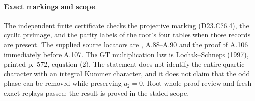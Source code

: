 \paragraph{Exact markings and scope.}
The independent finite certificate
checks the projective marking (D23.C36.4), the cyclic preimage,
and the parity labels of the root's four tables when those
records are present. The supplied source locators are
, A.88--A.90 and the proof
of A.106 immediately before A.107. The GT multiplication
law is Lochak--Schneps (1997), printed p.~572, equation (2).
The statement does not identify the entire quartic character
with an integral Kummer character, and it does not claim that
the odd phase can be removed while preserving $a_2=0$.
Root whole-proof review and fresh exact replays passed; the result is proved in the stated scope.
